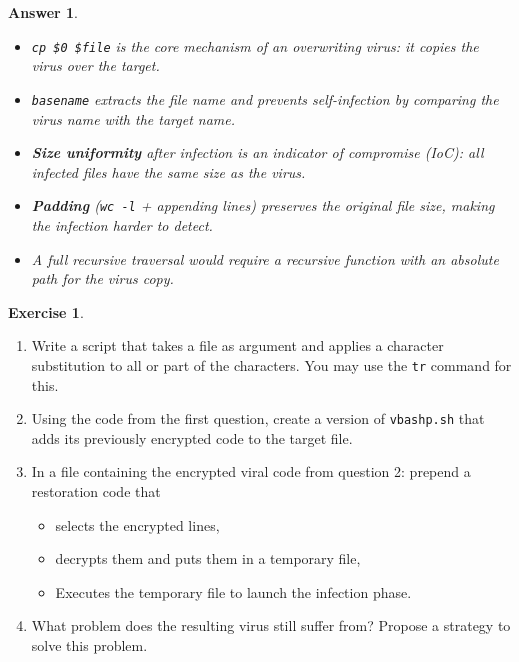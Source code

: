 \documentclass[a4paper,11pt]{article}
\theoremstyle{plain}
\newtheorem{correction}{Answer}
\theoremstyle{definition}
\newtheorem{exercice}{Exercise}
\begin{document}
\begin{correction}
\begin{enumerate}
\end{enumerate}

\begin{pointcle}
\begin{itemize}
    \item \texttt{cp \$0 \$file} is the core mechanism of an overwriting virus: it copies the virus over the target.
    \item \texttt{basename} extracts the file name and prevents self-infection by comparing the virus name with the target name.
    \item \textbf{Size uniformity} after infection is an indicator of compromise (IoC): all infected files have the same size as the virus.
    \item \textbf{Padding} (\texttt{wc -l} + appending lines) preserves the original file size, making the infection harder to detect.
    \item A full recursive traversal would require a recursive function with an absolute path for the virus copy.
\end{itemize}
\end{pointcle}

\end{correction}




\begin{exercice}

\begin{enumerate}
\item Write a script that takes a file as argument and applies a character substitution to all or part of the characters.
You may use the \texttt{tr} command for this.
\item Using the code from the first question, create a version of \texttt{vbashp.sh} that adds its previously encrypted code to the target file.
\item In a file containing the encrypted viral code from question 2: prepend a restoration code that
\begin{itemize}
\item selects the encrypted lines,
\item decrypts them and puts them in a temporary file,
\item Executes the temporary file to launch the infection phase.
\end{itemize}
\item What problem does the resulting virus still suffer from? Propose a strategy to solve this problem.
\end{enumerate}

\end{exercice}
\end{document}
